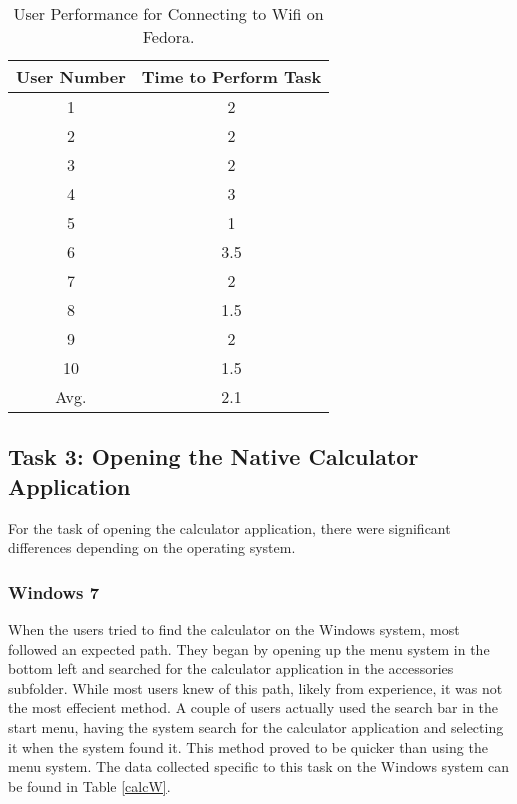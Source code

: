 \documentclass[11pt,letterpaper]{report}
\begin{document}
\begin{table}
    \centering
    \begin{tabular}{| c | c |}
        \hline
        User Number & Time to Perform Task \\ \hline
        1 & 2 \\  \hline
        2 & 2 \\  \hline
        3 & 2 \\ \hline
        4 & 3 \\  \hline
        5 & 1 \\    \hline
        6 & 3.5 \\  \hline
        7 & 2 \\ \hline
        8 & 1.5 \\  \hline
        9 & 2 \\ \hline
        10 & 1.5 \\ \hline
        Avg. & 2.1 \\
        \hline
    \end{tabular}
    \caption{User Performance for Connecting to Wifi on Fedora.}
    \label{wifiL}    
\end{table}

\subsection{Task 3: Opening the Native Calculator Application}
For the task of opening the calculator application, there were significant differences depending on the operating system. 

\subsubsection{Windows 7}
When the users tried to find the calculator on the Windows system, most followed an expected path. They began by opening up the menu system in the bottom left and searched for the calculator application in the accessories subfolder. While most users knew of this path, likely from experience, it was not the most effecient method. A couple of users actually used the search bar in the start menu, having the system search for the calculator application and selecting it when the system found it. This method proved to be quicker than using the menu system. The data collected specific to this task on the Windows system can be found in Table \ref{calcW}.
\end{document}
